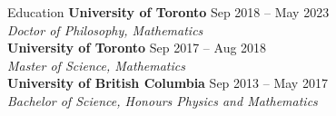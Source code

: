 \documentclass{resume}
\begin{document}
\begin{rSection}{Education}
\textbf{University of Toronto} \hfill {\normalfont Sep 2018 -- May 2023} \\
{\normalfont \textit{Doctor of Philosophy, Mathematics}} \\
\textbf{University of Toronto} \hfill {\normalfont Sep 2017 -- Aug 2018} \\
{\normalfont \textit{Master of Science, Mathematics}} \\
\textbf{University of British Columbia} \hfill {\normalfont Sep 2013 -- May 2017}\\
{\normalfont \textit{Bachelor of Science, Honours Physics and Mathematics}}

\end{rSection}

\end{document}
